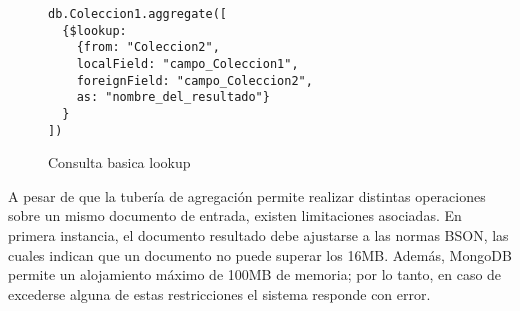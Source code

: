 \documentclass[conference,compsoc]{sty/IEEEtran}
\begin{document}
\begin{figure}
    \begin{verbatim}
db.Coleccion1.aggregate([
  {$lookup:
    {from: "Coleccion2",
    localField: "campo_Coleccion1",
    foreignField: "campo_Coleccion2",
    as: "nombre_del_resultado"}
  }
])
\end{verbatim}
\caption{Consulta basica lookup} 
\label{fig:consulta-basica-lookup}
\end{figure}


A pesar de que la tubería de agregación permite realizar distintas operaciones sobre un mismo documento de entrada, existen limitaciones asociadas. En primera instancia, el documento resultado debe ajustarse a las normas BSON, las cuales indican que un documento no puede superar los 16MB. Además, MongoDB permite un alojamiento máximo de 100MB de memoria; por lo tanto, en caso de excederse alguna de estas restricciones el sistema responde con error.
\end{document}
